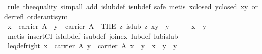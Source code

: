 \begin{isabellebody}
\ {}rule\ the{}equality{}\ simp{}all\ add{}\ is{}lub{}def\ is{}ub{}def{}\ safe{}\ {}metis\ x{}closed\ y{}closed\ xy\ order{}refl\ order{}antisym{}{}{}\isanewline
\ \ \isamarkupfalse%
\isanewline
\ \ \ \ \isamarkupfalse%
\ {}x\ {}\ carrier\ A{}\ \ {}y\ {}\ carrier\ A{}\ \ {}{}THE\ z{}\ is{}lub\ z\ {}x{}y{}{}\ {}\ y{}\isanewline
\ \ \ \ \isamarkupfalse%
\ {}x\ {}\ y{}\isanewline
\ \ \ \ \ \ \isamarkupfalse%
\ {}metis\ insertCI\ is{}lub{}def\ is{}ub{}def\ join{}ex\ lub{}def\ lub{}is{}lub{}\isanewline
\ \ \isamarkupfalse%
%
\endisatagproof
{\isafoldproof}%
%
\isadelimproof
\isanewline
%
\endisadelimproof
\isanewline
\ \ \isamarkupfalse%
\ leq{}def{}right{}\ {}{}x\ {}\ carrier\ A{}\ y\ {}\ carrier\ A{}\ x\ {}\ y{}\ {}\ {}x\ {}\ y\ {}\ y{}{}\isanewline

\end{isabellebody}
